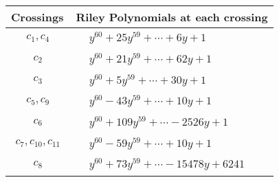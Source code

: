 \documentclass[1p]{elsarticle_modified}
\theoremstyle{definition}
\begin{document}
\begin{tabular}{m{50pt}|m{274pt}}
Crossings & \hspace{64pt}Riley Polynomials at each crossing \\
\hline $$\begin{aligned}c_{1},c_{4}\end{aligned}$$&$\begin{aligned}
&y^{60}+25 y^{59}+\cdots+6 y+1
\end{aligned}$\\
\hline $$\begin{aligned}c_{2}\end{aligned}$$&$\begin{aligned}
&y^{60}+21 y^{59}+\cdots+62 y+1
\end{aligned}$\\
\hline $$\begin{aligned}c_{3}\end{aligned}$$&$\begin{aligned}
&y^{60}+5 y^{59}+\cdots+30 y+1
\end{aligned}$\\
\hline $$\begin{aligned}c_{5},c_{9}\end{aligned}$$&$\begin{aligned}
&y^{60}-43 y^{59}+\cdots+10 y+1
\end{aligned}$\\
\hline $$\begin{aligned}c_{6}\end{aligned}$$&$\begin{aligned}
&y^{60}+109 y^{59}+\cdots-2526 y+1
\end{aligned}$\\
\hline $$\begin{aligned}c_{7},c_{10},c_{11}\end{aligned}$$&$\begin{aligned}
&y^{60}-59 y^{59}+\cdots+10 y+1
\end{aligned}$\\
\hline $$\begin{aligned}c_{8}\end{aligned}$$&$\begin{aligned}
&y^{60}+73 y^{59}+\cdots-15478 y+6241
\end{aligned}$\\
\hline
\end{tabular}
\vskip 2pc
\end{document}
